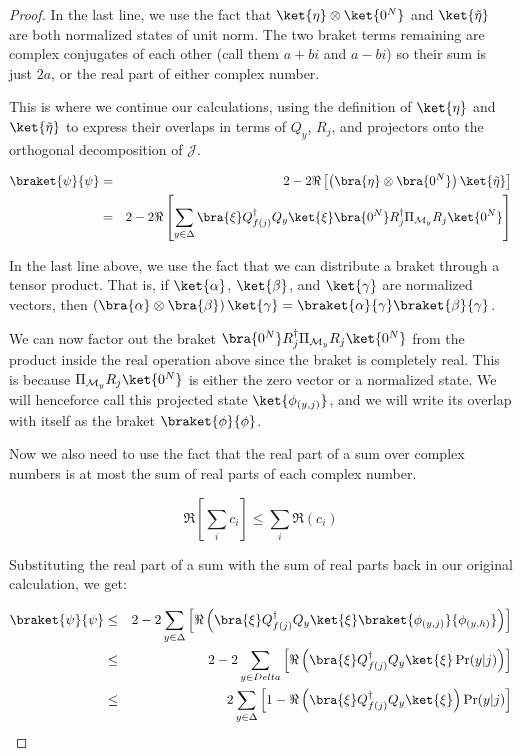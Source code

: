 \begin{proof}
In the last line, we use the fact that $\ket{\eta} \otimes \ket{0^N}$ and
$\ket{\tilde{\eta}}$ are both normalized states of unit norm. The two braket
terms remaining are complex conjugates of each other (call them $a+bi$ and
$a-bi$) so their sum is just $2a$, or the real part of either complex number.

This is where we continue our calculations, using the definition of $\ket{\eta}$
and $\ket{\tilde{\eta}}$ to express their overlaps in terms of $Q_y$,
$R_j$, and projectors onto the orthogonal decomposition of $\mathcal{J}$.

\begin{eqnarray}
\braket{\psi}{\psi} & = & 2 - 2\Re\left[ \left(\bra{\eta} \otimes \bra{0^N}\right) \ket{\tilde{\eta}} \right] \\
                    & = & 2 - 2\Re\left[ \sum_{y \in \Delta} \bra{\xi}Q_{f(j)}^{\dagger}Q_y \ket{\xi}
                                                             \bra{0^N}R_j^{\dagger}\Pi_{\mathcal{M}_y}R_j\ket{0^N} \right]
\end{eqnarray}

In the last line above, we use the fact that we can distribute a braket
through a tensor product. That is, if $\ket{\alpha}$, $\ket{\beta}$, and
$\ket{\gamma}$ are normalized vectors, then
$\left( \bra{\alpha} \otimes \bra{\beta}\right) \ket{\gamma} = 
 \braket{\alpha}{\gamma}\braket{\beta}{\gamma}$.
 
We can now factor out the braket
$\bra{0^N}R_j^{\dagger}\Pi_{\mathcal{M}_y}R_j\ket{0^N}$ from the product
inside the real operation above since the braket is completely real. This is
because $\Pi_{\mathcal{M}_y}R_j \ket{0^N}$ is either the zero vector or
a normalized state. We will henceforce call this projected state
$\ket{\phi_{(y,j)}}$, and we will write its overlap with itself
as the braket $\braket{\phi}{\phi}$.

Now we also need to use the fact that the real part of a sum over complex
numbers is at most the sum of real parts of each complex number.

\begin{equation}
\Re\left[ \sum_{i} c_i \right] \le \sum_{i} \Re( c_i )
\end{equation}

Substituting the real part of a sum with the sum of real parts
back in our original calculation, we get:

\begin{eqnarray}
\braket{\psi}{\psi} & \le & 2 - 2\sum_{y \in \Delta} \left[ \Re\left(
  \bra{\xi}Q_{f(j)}^{\dagger}Q_y \ket{\xi}
  \braket{\phi_{(y,j)}}{\phi_{(y,h)}} \right) \right] \\
   & \le & 2 - 2\sum_{y \in Delta} \left[ \Re\left(
           \bra{\xi}Q_{f(j)}^{\dagger}Q_y \ket{\xi}\Pr(y | j) \right)\right] \\
   & \le & 2 \sum_{y \in \Delta}\left[
           1 - \Re\left( \bra{\xi}Q_{f(j)}^{\dagger}Q_y \ket{\xi} \right)
           \Pr(y | j) \right]
\end{eqnarray}


\end{proof}
